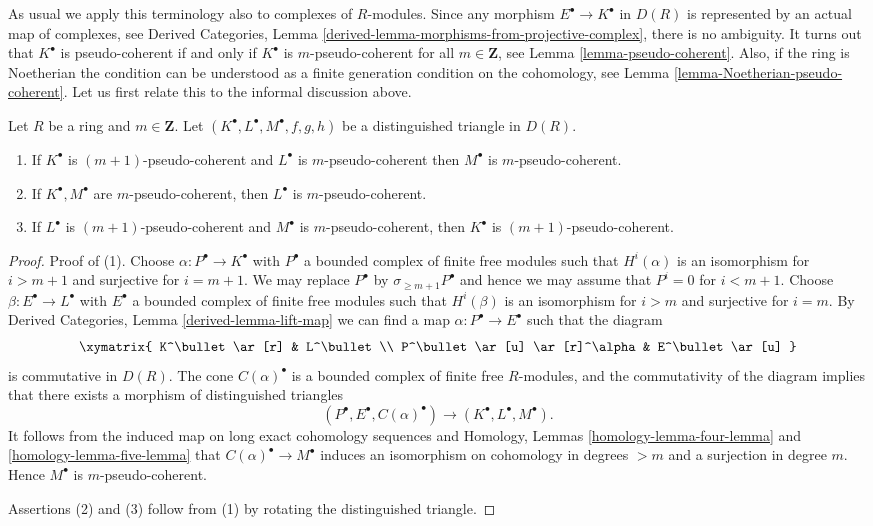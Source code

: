 \noindent
As usual we apply this terminology also to complexes of $R$-modules.
Since any morphism $E^\bullet \to K^\bullet$ in $D(R)$ is represented
by an actual map of complexes, see
Derived Categories, Lemma \ref{derived-lemma-morphisms-from-projective-complex},
there is no ambiguity.
It turns out that $K^\bullet$ is pseudo-coherent if and only if
$K^\bullet$ is $m$-pseudo-coherent for all $m \in \mathbf{Z}$, see
Lemma \ref{lemma-pseudo-coherent}.
Also, if the ring is Noetherian the condition can be understood
as a finite generation condition on the cohomology, see
Lemma \ref{lemma-Noetherian-pseudo-coherent}.
Let us first relate this to the informal discussion above.

\begin{lemma}
\label{lemma-cone-pseudo-coherent}
Let $R$ be a ring and $m \in \mathbf{Z}$.
Let $(K^\bullet, L^\bullet, M^\bullet, f, g, h)$ be a distinguished
triangle in $D(R)$.
\begin{enumerate}
\item If $K^\bullet$ is $(m + 1)$-pseudo-coherent and
$L^\bullet$ is $m$-pseudo-coherent then $M^\bullet$ is
$m$-pseudo-coherent.
\item If $K^\bullet, M^\bullet$ are $m$-pseudo-coherent, then
$L^\bullet$ is $m$-pseudo-coherent.
\item If $L^\bullet$ is $(m + 1)$-pseudo-coherent and $M^\bullet$
is $m$-pseudo-coherent, then $K^\bullet$ is $(m + 1)$-pseudo-coherent.
\end{enumerate}
\end{lemma}

\begin{proof}
Proof of (1). Choose $\alpha : P^\bullet \to K^\bullet$
with $P^\bullet$ a bounded complex of finite free modules
such that $H^i(\alpha)$ is an isomorphism for $i > m + 1$ and
surjective for $i = m + 1$. We may replace $P^\bullet$ by
$\sigma_{\geq m + 1}P^\bullet$ and hence we may assume that $P^i = 0$
for $i < m + 1$. Choose $\beta : E^\bullet \to L^\bullet$ with $E^\bullet$
a bounded complex of finite free modules such that
$H^i(\beta)$ is an isomorphism for $i > m$ and
surjective for $i = m$. By
Derived Categories,
Lemma \ref{derived-lemma-lift-map}
we can find a map $\alpha : P^\bullet \to E^\bullet$ such that the diagram
$$
\xymatrix{
K^\bullet \ar[r] & L^\bullet \\
P^\bullet \ar[u] \ar[r]^\alpha & E^\bullet \ar[u]
}
$$
is commutative in $D(R)$. The cone $C(\alpha)^\bullet$ is a bounded
complex of finite free $R$-modules, and the commutativity of the
diagram implies that there exists a morphism of distinguished triangles
$$
(P^\bullet, E^\bullet, C(\alpha)^\bullet)
\longrightarrow
(K^\bullet, L^\bullet, M^\bullet).
$$
It follows from the induced map on long exact cohomology sequences and
Homology, Lemmas \ref{homology-lemma-four-lemma} and
\ref{homology-lemma-five-lemma}
that $C(\alpha)^\bullet \to M^\bullet$ induces an isomorphism
on cohomology in degrees $> m$ and a surjection in degree $m$.
Hence $M^\bullet$ is $m$-pseudo-coherent.

\medskip\noindent
Assertions (2) and (3) follow from (1) by rotating the distinguished
triangle.
\end{proof}

